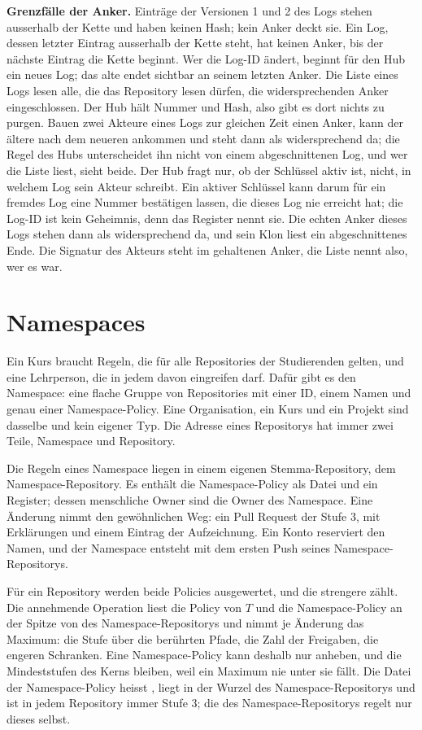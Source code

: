 \startinfobox
{\bf Grenzfälle der Anker.}
Einträge der Versionen 1 und 2 des Logs stehen ausserhalb der Kette und haben keinen Hash; kein
Anker deckt sie.
Ein Log, dessen letzter Eintrag ausserhalb der Kette steht, hat keinen Anker, bis der nächste
Eintrag die Kette beginnt.
Wer die Log-ID ändert, beginnt für den Hub ein neues Log; das alte endet sichtbar an seinem
letzten Anker.
Die Liste eines Logs lesen alle, die das Repository lesen dürfen, die widersprechenden Anker
eingeschlossen.
Der Hub hält Nummer und Hash, also gibt es dort nichts zu purgen.
Bauen zwei Akteure eines Logs zur gleichen Zeit einen Anker, kann der ältere nach dem neueren
ankommen und steht dann als widersprechend da; die Regel des Hubs unterscheidet ihn nicht von
einem abgeschnittenen Log, und wer die Liste liest, sieht beide.
Der Hub fragt nur, ob der Schlüssel aktiv ist, nicht, in welchem Log sein Akteur schreibt.
Ein aktiver Schlüssel kann darum für ein fremdes Log eine Nummer bestätigen lassen, die dieses
Log nie erreicht hat; die Log-ID ist kein Geheimnis, denn das Register nennt sie.
Die echten Anker dieses Logs stehen dann als widersprechend da, und sein Klon liest ein
abgeschnittenes Ende.
Die Signatur des Akteurs steht im gehaltenen Anker, die Liste nennt also, wer es war.
\stopinfobox

\section[sec:namespaces]{Namespaces}

Ein Kurs braucht Regeln, die für alle Repositories der Studierenden gelten, und eine Lehrperson,
die in jedem davon eingreifen darf.
Dafür gibt es den Namespace: eine flache Gruppe von Repositories mit einer ID, einem Namen und
genau einer Namespace-Policy.
Eine Organisation, ein Kurs und ein Projekt sind dasselbe und kein eigener Typ.
Die Adresse eines Repositorys hat immer zwei Teile, Namespace und Repository.

Die Regeln eines Namespace liegen in einem eigenen Stemma-Repository, dem Namespace-Repository.
Es enthält die Namespace-Policy als Datei und ein Register; dessen menschliche Owner sind die
Owner des Namespace.
Eine Änderung nimmt den gewöhnlichen Weg: ein Pull Request der Stufe 3, mit Erklärungen und einem
Eintrag der Aufzeichnung.
Ein Konto reserviert den Namen, und der Namespace entsteht mit dem ersten Push seines
Namespace-Repositorys.

Für ein Repository werden beide Policies ausgewertet, und die strengere zählt.
Die annehmende Operation liest die Policy von $T$ und die Namespace-Policy an der Spitze von
 des Namespace-Repositorys und nimmt je Änderung das Maximum: die Stufe über die
berührten Pfade, die Zahl der Freigaben, die engeren Schranken.
Eine Namespace-Policy kann deshalb nur anheben, und die Mindeststufen des Kerns bleiben, weil ein
Maximum nie unter sie fällt.
Die Datei der Namespace-Policy heisst , liegt in der Wurzel des
Namespace-Repositorys und ist in jedem Repository immer Stufe 3; die  des
Namespace-Repositorys regelt nur dieses selbst.

